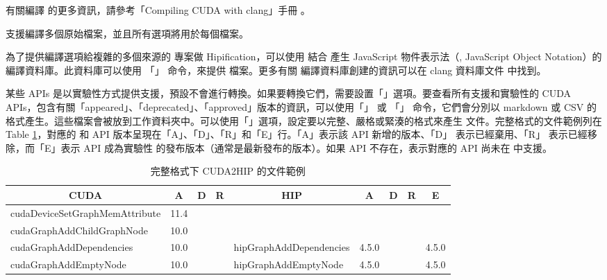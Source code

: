 有關編譯  的更多資訊，請參考「Compiling CUDA with clang」手冊 \cite{amd2021compiling}。

 支援編譯多個原始檔案，並且所有選項將用於每個檔案。

為了提供編譯選項給複雜的多個來源的  專案做 Hipification，可以使用  結合  產生 JavaScript 物件表示法（, JavaScript Object Notation）的編譯資料庫。此資料庫可以使用 「」 命令，來提供  檔案。更多有關  編譯資料庫創建的資訊可以在 clang  資料庫文件\cite{clang2018clang} 中找到。

某些  APIs 是以實驗性方式提供支援，預設不會進行轉換。如果要轉換它們，需要設置「」選項。要查看所有支援和實驗性的 CUDA APIs，包含有關「appeared」、「deprecated」、「approved」版本的資訊，可以使用「」 或 「」 命令，它們會分別以 markdown 或 CSV 的格式產生。這些檔案會被放到工作資料夾中。可以使用「」選項，設定要以完整、嚴格或緊湊的格式來產生  文件。完整格式的文件範例列在 Table \ref{tab:CUDA2HIP}，對應的  和  API 版本呈現在「A」、「D」、「R」和「E」行。「A」表示該 API 新增的版本、「D」 表示已經棄用、「R」 表示已經移除，而「E」表示 API 成為實驗性  的發布版本（通常是最新發布的版本）。如果  API 不存在，表示對應的  API 尚未在  中支援。

\begin{table}[htbp]
    \centering
    \begin{tabular}{@{}lccclcccc}
        \toprule
        \multicolumn{1}{c}{CUDA} & \multicolumn{1}{c}{A} & \multicolumn{1}{c}{D} & \multicolumn{1}{c}{R} & \multicolumn{1}{c}{HIP} & \multicolumn{1}{c}{A} & \multicolumn{1}{c}{D} & \multicolumn{1}{c}{R} & \multicolumn{1}{c}{E} \\
        \midrule
        cudaDeviceSetGraphMemAttribute & 11.4 \\
        cudaGraphAddChildGraphNode & 10.0 \\
        cudaGraphAddDependencies & 10.0 &&& hipGraphAddDependencies & 4.5.0 &&& 4.5.0 \\
        cudaGraphAddEmptyNode & 10.0 &&& hipGraphAddEmptyNode & 4.5.0 &&& 4.5.0 \\
        \bottomrule
    \end{tabular}
    \caption{完整格式下 CUDA2HIP 的文件範例}
    \label{tab:CUDA2HIP}
\end{table}

